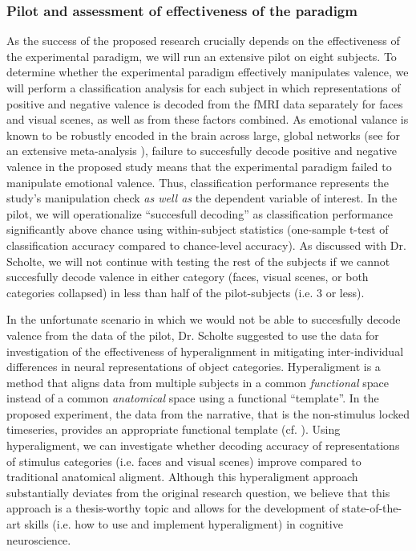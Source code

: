 \documentclass[12pt,a4paper]{article}\usepackage[]{graphicx}\usepackage[]{color}
\begin{document}
\subsubsection{Pilot and assessment of effectiveness of the paradigm}

As the success of the proposed research crucially depends on the effectiveness of the experimental paradigm, we will run an extensive pilot on eight subjects. To determine whether the experimental paradigm effectively manipulates valence, we will perform a classification analysis for each subject in which representations of positive and negative valence is decoded from the fMRI data separately for faces and visual scenes, as well as from these factors combined. As emotional valance is known to be robustly encoded in the brain across large, global networks (see for an extensive meta-analysis \citealp{lindquist2015}), failure to succesfully decode positive and negative valence in the proposed study means that the experimental paradigm failed to manipulate emotional valence. Thus, classification performance represents the study's manipulation check \emph{as well as} the dependent variable of interest. In the pilot, we will operationalize ``succesfull decoding'' as classification performance significantly above chance using within-subject statistics (one-sample t-test of classification accuracy compared to chance-level accuracy). As discussed with Dr. Scholte, we will not continue with testing the rest of the subjects if we cannot succesfully decode valence in either category (faces, visual scenes, or both categories collapsed) in less than half of the pilot-subjects (i.e. 3 or less). 

In the unfortunate scenario in which we would not be able to succesfully decode valence from the data of the pilot, Dr. Scholte suggested to use the data for investigation of the effectiveness of hyperalignment \citep{hasson2004} in mitigating inter-individual differences in neural representations of object categories. Hyperaligment is a method that aligns data from multiple subjects in a common \emph{functional} space instead of a common \emph{anatomical} space using a functional ``template''. In the proposed experiment, the data from the narrative, that is the non-stimulus locked timeseries, provides an appropriate functional template (cf. \citealp{hanke2014}). Using hyperaligment, we can investigate whether decoding accuracy of representations of stimulus categories (i.e. faces and visual scenes) improve compared to traditional anatomical aligment. Although this hyperaligment approach substantially deviates from the original research question, we believe that this approach is a thesis-worthy topic and allows for the development of state-of-the-art skills (i.e. how to use and implement hyperaligment) in cognitive neuroscience.
\end{document}
